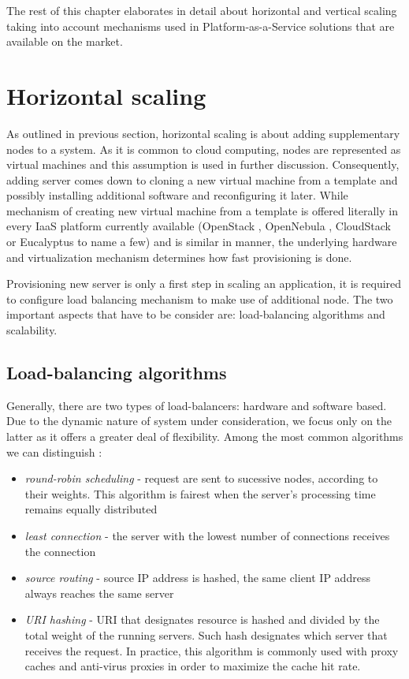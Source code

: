 The rest of this chapter elaborates in detail about horizontal and vertical scaling taking into account mechanisms used in Platform-as-a-Service solutions that are available on the market.

\section{Horizontal scaling}
As outlined in previous section, horizontal scaling is about adding supplementary nodes to a system. As it is common to cloud computing, nodes are represented as virtual machines and this assumption is used in further discussion. Consequently, adding server comes down to cloning a new virtual machine from a template and possibly installing additional software and reconfiguring it later. While mechanism of creating new virtual machine from a template is offered literally in every IaaS platform currently available (OpenStack \cite{OpenStack}, OpenNebula \cite{OpenNebula}, CloudStack \cite{CloudStack} or Eucalyptus \cite{Eucalyptus} to name a few) and is similar in manner, the underlying hardware and virtualization mechanism determines how fast provisioning is done. 

Provisioning new server is only a first step in scaling an application, it is required to configure load balancing mechanism to make use of additional node. The two important aspects that have to be consider are: load-balancing algorithms and scalability.

\subsection{Load-balancing algorithms}
Generally, there are two types of load-balancers: hardware and software based. Due to the dynamic nature of system under consideration, we focus only on the latter as it offers a greater deal of flexibility. Among the most common algorithms we can distinguish \cite{HaProxyDoc}:
\begin{itemize}
 \item \textit{round-robin scheduling} - request are sent to sucessive nodes, according to their weights. This algorithm is fairest when the server's processing time remains equally distributed \cite{HaProxyDoc}
 \item \textit{least connection} - the server with the lowest number of connections receives the connection
 \item \textit{source routing} - source IP address is hashed, the same client IP address always reaches the same server
 \item \textit{URI hashing} - URI that designates resource is hashed and divided by the total weight of the running servers. Such hash designates which server that receives the request. In practice, this algorithm is commonly used with proxy caches and anti-virus proxies in order to maximize the cache hit rate.
\end{itemize}

